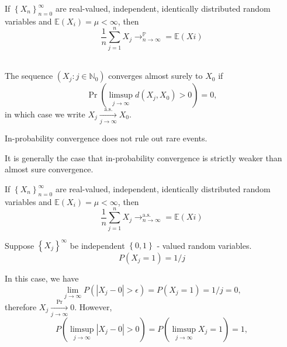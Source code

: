 \documentclass{tufte-handout}
\begin{document}
\begin{Theorem}
    If \( \left\{X_n\right\}_{n=0}^{\infty} \) are real-valued,
    independent, identically distributed random variables and
    \(\mathbb{E}(X_i) = \mu < \infty\), then
    \[\frac{1}{n} \sum_{j=1}^{n}X_j\rightarrow^{\mathbb{P}}_{n\rightarrow\infty}=\mathbb{E}(Xi)\]
\end{Theorem}

\begin{Definition}\hfill\\
    The sequence $(X_j : j \in \mathbb{N}_0)$ converges almost surely to $X_0$ if
\[
\Pr\left(\limsup_{j \to \infty} d(X_j, X_0) > 0\right) = 0,
\]
in which case we write
\(
X_j \xrightarrow[\mathrel{j \to \infty}]{\mathrm{a.s.}} X_0.
\)

In-probability convergence does not rule out rare events.
    
\end{Definition}


It is generally the case that in-probability convergence is strictly weaker than almost sure convergence.

\begin{Theorem}
    If \( \left\{X_n\right\}_{n=0}^{\infty} \) are real-valued,
    independent, identically distributed random variables and
    \(\mathbb{E}(X_i) = \mu < \infty\), then
    \[\frac{1}{n} \sum_{j=1}^{n}X_j\rightarrow^{\text{a.s.}}_{n\rightarrow\infty}=\mathbb{E}(Xi)\]
\end{Theorem}


\begin{Example}
    Suppose \( \left\{X_j\right\}^{\infty} \) be independent  \( \left\{0,1\right\} \) - valued
    random variables.
    \[P(X_j=1) = 1\slash j\]
\end{Example}

In this case, we have 
\[\lim_{j\rightarrow \infty } P(\left|X_j-0\right| > \epsilon) = P(X_j=1) = 1\slash j = 0,\]
therefore \(X_j \xrightarrow[\mathrel{j \to \infty}]{\mathrm{Pr}} 0\). However, 
\[P(\limsup_{j\rightarrow\infty} \left|X_j-0\right| > 0) = P(\limsup_{j\rightarrow\infty} X_j = 1) = 1,\]
\end{document}
